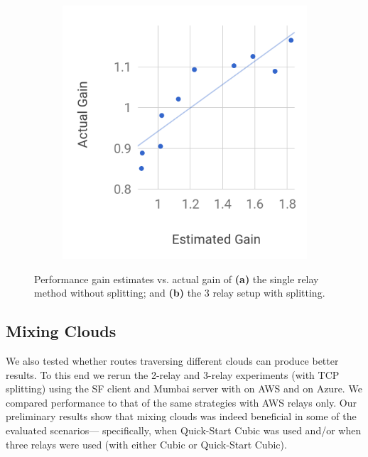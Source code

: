 \documentclass{hotnets17}
\providecommand{\vs}{vs. }
\begin{document}
\begin{figure}[t]
\begin{subfigure}{0.47\columnwidth}
  \includegraphics[width=\columnwidth]{figures/gainEstimateVsActual-ssh-3hop-newer}
    \caption{} \label{fig:rtt-estimate-ssh-3hop}
\end{subfigure}
    \caption{Performance gain estimates \vs actual gain of \textbf{(a)} the single relay method without splitting; and \textbf{(b)} the 3 relay setup with splitting.}
\end{figure}



\subsection{Mixing Clouds}

We also tested whether routes traversing different clouds can produce better results. To this end we rerun the 2-relay and 3-relay experiments (with TCP splitting) using the SF client and Mumbai server with \rc on AWS and \rs on Azure. We compared performance to that of the same strategies with AWS relays only. Our preliminary results show that mixing clouds was indeed beneficial in some of the evaluated scenarios--- specifically, when Quick-Start Cubic was used and/or when three relays were used (with either Cubic or Quick-Start Cubic). 
\end{document}
